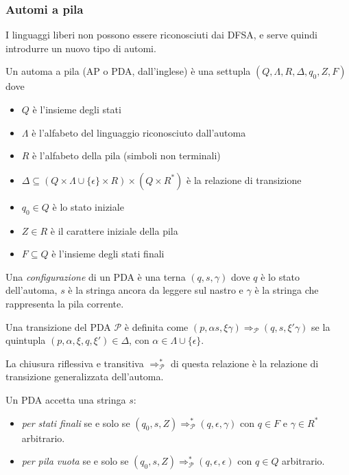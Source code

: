 \documentclass[12pt]{article}
\numberwithin{theorem}{subsection}
\begin{document}
\subsubsection{Automi a pila}
I linguaggi liberi non possono essere riconosciuti dai DFSA, e serve quindi introdurre un nuovo tipo di automi.

\begin{definition}
	Un automa a pila (AP o PDA, dall'inglese) è una settupla $( Q, \Lambda, R, \Delta, q_0, Z, F )$ dove
	\begin{itemize}
		\item $Q$ è l'insieme degli stati
		\item $\Lambda$ è l'alfabeto del linguaggio riconosciuto dall'automa
		\item $R$ è l'alfabeto della pila (simboli non terminali)
		\item $\Delta \subseteq (Q \times \Lambda \cup \{ \epsilon \} \times R) \times (Q \times R^*)$ è la relazione di transizione
		\item $q_0 \in Q$ è lo stato iniziale
		\item $Z \in R$ è il carattere iniziale della pila
		\item $F \subseteq Q$ è l'insieme degli stati finali
	\end{itemize}
\end{definition}

\begin{definition}
	Una \textit{configurazione} di un PDA è una terna $(q, s, \gamma)$ dove $q$ è lo stato dell'automa, $s$ è la stringa ancora da leggere sul nastro e $\gamma$ è la stringa che rappresenta la pila corrente.
	
	Una transizione del PDA $\mathcal{P}$ è definita come $(p, \alpha s, \xi\gamma) \Rightarrow_{\mathcal{P}} (q, s, \xi'\gamma)$ se la quintupla $(p, \alpha, \xi, q, \xi') \in \Delta$, con $\alpha \in \Lambda \cup \{ \epsilon \}$.
	
	La chiusura riflessiva e transitiva $\Rightarrow_\mathcal{P}^*$ di questa relazione è la relazione di transizione generalizzata dell'automa.
	
	Un PDA accetta una stringa $s$:
	\begin{itemize}
		\item \textit{per stati finali} se e solo se $(q_0, s, Z) \Rightarrow_{\mathcal{P}}^* (q, \epsilon, \gamma)$ con $q \in F$ e $\gamma \in R^*$ arbitrario.
		\item \textit{per pila vuota} se e solo se $(q_0, s, Z) \Rightarrow_{\mathcal{P}}^* (q, \epsilon, \epsilon)$ con $q \in Q$ arbitrario.
	\end{itemize}
\end{definition}
\end{document}
